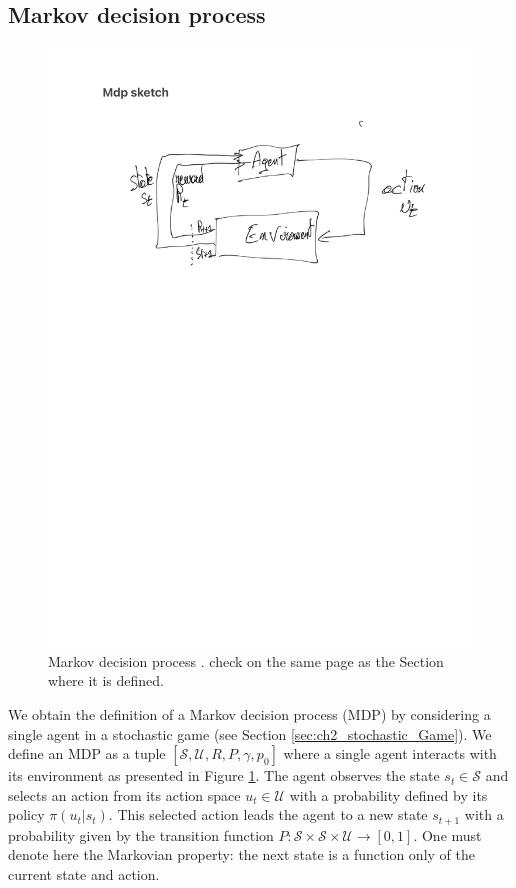 \subsection{Markov decision process} \label{sec:ch2_mdp}
\begin{figure}
    \centering
    \includegraphics[width=\textwidth]{tex_thesis/figures/ch2/mdp_sketch.pdf}
    \caption{Markov decision process \citep{sutton2018reinforcement}. \todo check on the same page as the Section where it is defined.}
    \label{fig:ch2_mdp}
\end{figure}

We obtain the definition of a Markov decision process (MDP) by considering a single agent in a stochastic game (see Section \ref{sec:ch2_stochastic_Game}).
We define an MDP as a tuple $[\mathcal{S}, \mathcal{U}, R, P, \gamma, p_0]$ where a single agent interacts with its environment as presented in Figure \ref{fig:ch2_mdp}.
The agent observes the state $s_t \in \mathcal{S}$ and selects an action from its action space $u_t \in \mathcal{U}$ with a probability defined by its policy $\pi(u_t|s_t)$.
This selected action leads the agent to a new state $s_{t+1}$ with a probability given by the transition function $P:\mathcal{S} \times \mathcal{S} \times \mathcal{U} \rightarrow [0,1]$.
One must denote here the Markovian property: the next state is a function only of the current state and action.

